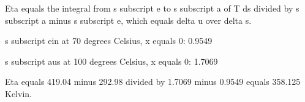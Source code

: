 Eta equals the integral from s subscript e to s subscript a of T ds divided by s subscript a minus s subscript e, which equals delta u over delta s.

s subscript ein at 70 degrees Celsius, x equals 0: 0.9549

s subscript aus at 100 degrees Celsius, x equals 0: 1.7069

Eta equals 419.04 minus 292.98 divided by 1.7069 minus 0.9549 equals 358.125 Kelvin.